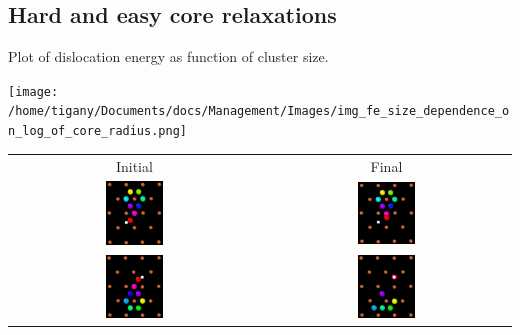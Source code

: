 \documentclass[a4paper]{apa6}
\begin{document}
\subsection{Hard and easy core relaxations}
\label{sec:org266eb33}

Plot of dislocation energy as function of cluster size. 
\begin{center}
\texttt{[image: /home/tigany/Documents/docs/Management/Images/img\_fe\_size\_dependence\_on\_log\_of\_core\_radius.png]}
\end{center}



     \begin{table}	
    \begin{tabular}{cc}
        \small  Initial  & Final \\ 
	     \includegraphics[width=0.24\textwidth]{../Images/easy_core_initial_all_fe_octahedral_sites_with_core.png} &
	           \includegraphics[width=0.24\textwidth]{../Images/easy_core_final_all_fe_octahedral_sites_with_core.png}  \\
	     \includegraphics[width=0.24\textwidth]{../Images/hard_core_initial_all_fe_octahedral_sites_with_core.png} &
	           \includegraphics[width=0.24\textwidth]{../Images/hard_core_final_all_fe_octahedral_sites_with_core.png}  \\
		   

\end{tabular}
\end{table}
\end{document}
